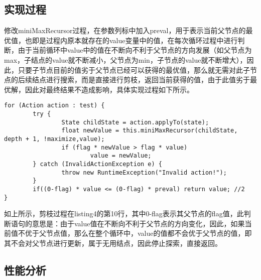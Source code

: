 \documentclass[UTF8]{article}
\begin{document}
\subsection{实现过程}
\indent 修改miniMaxRecursor过程，在参数列标中加入preval，用于表示当前父节点的最优值，也即是过程内原本就存在的value变量中的值，在每次循环过程中进行判断，由于当前循环中value中的值在不断向不利于父节点的方向发展（如父节点为max，子结点的value就不断减小，父节点为min，子节点的value就不断增大），因此，只要子节点目前的值劣于父节点已经可以获得的最优值，那么就无需对此子节点的后续结点进行搜索，而是直接进行剪枝，返回当前获得的值，由于此值劣于最优解，因此对最终结果不造成影响，具体实现过程如下所示。
\begin{lstlisting}[caption=alphabeta剪枝]
for (Action action : test) {
		try {
				State childState = action.applyTo(state);
				float newValue = this.miniMaxRecursor(childState, depth + 1, !maximize,value);
				if (flag * newValue > flag * value) 
						value = newValue;
		} catch (InvalidActionException e) {
				throw new RuntimeException("Invalid action!");
		}
		if((0-flag) * value <= (0-flag) * preval) return value; //2
}
\end{lstlisting}

\indent 如上所示，剪枝过程在listing4的第10行，其中0-flag表示其父节点的flag值，此判断语句的意思是：由于value值在不断向不利于父节点的方向变化，因此，如果当前值不优于父节点值，那么在整个循环中，value的值都不会优于父节点的值，即其不会对父节点进行更新，属于无用结点，因此停止探索，直接返回。

\subsection{性能分析}
\end{document}
